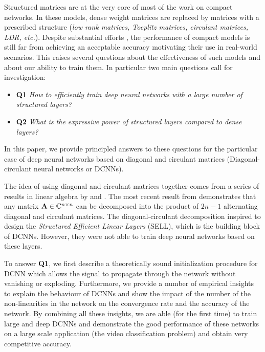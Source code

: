 Structured matrices are at the very core of most of the work on compact networks.
In these models, dense weight matrices are replaced by matrices with a prescribed structure (\emph{low rank matrices, Toeplitz matrices, circulant matrices, LDR, etc.}).
Despite substantial efforts \cite{cheng,moczulski2015acdc}, the performance of compact models is still far from achieving an acceptable accuracy motivating their use in real-world scenarios.
This raises several questions about the effectiveness of such models and about our ability to train them. In particular two main questions call for investigation:
\begin{itemize}
  \item[] \textbf{Q1} {\em  How to efficiently train deep neural networks with a large number of structured layers?}
  \item[] \textbf{Q2} {\em What is the expressive power of structured layers compared to dense layers?}
\end{itemize}


In this paper, we provide principled answers to these questions for the particular case of deep neural networks based on diagonal and circulant matrices (\aka Diagonal-circulant neural networks or DCNNs). 

The idea of using diagonal and circulant matrices together comes from a series of results in linear algebra by \citet{muller1998algorithmic} and \citet{Huhtanen2015}.
The most recent result from \citet{Huhtanen2015} demonstrates that any matrix $\mathbf{A} \in {\ensuremath \mathbb{C}}^{n \times n}$ can be decomposed into the product of $2n-1$ alternating diagonal and circulant matrices.
The diagonal-circulant decomposition inspired \citet{moczulski2015acdc} to design the \emph{Structured Efficient Linear Layers} (SELL), which is the building block of DCNNs.
However, they were not able to train deep neural networks based on these layers. 

To answer \textbf{Q1}, we first describe a theoretically sound initialization procedure for DCNN which allows the signal to propagate through the network without vanishing or exploding.
Furthermore, we provide a number of empirical insights to explain the behaviour of DCNNs and show the impact of the number of the non-linearities in the network on the convergence rate and the accuracy of the network. 
By combining all these insights, we are able (for the first time) to train large and deep DCNNs and demonstrate the good performance of these networks on a large scale application (the \yt video classification problem) and obtain very competitive accuracy. 

